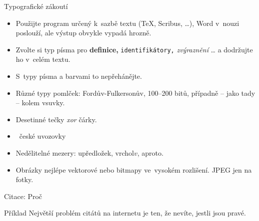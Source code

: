 \documentclass{beamer}
\begin{document}
\begin{frame}{Typografické zákoutí}

\begin{itemize}
\item Použijte program určený k~sazbě textu (\TeX, Scribus, \dots),
   Word v~nouzi poslouží, ale výstup obvykle vypadá hrozně.
\item Zvolte si typ písma pro {\bf definice,} {\tt identifikátory,} {\it zvýraznění\/} \dots{} a
   dodržujte ho v~celém textu.
\item S~typy písma a barvami to nepřehánějte.
\item Různé typy pomlček: Fordův-Fulkersonův, 100--200 bitů, případně -- jako tady -- kolem vsuvky.
\item Desetinné tečky {\it xor\/} čárky.
\item \clqq~české uvozovky \crqq
\item Nedělitelné mezery: u{\tt{}}předložek, vrchol{\tt{}}$v$, a{\tt{}}proto.
\item Obrázky nejlépe vektorové nebo bitmapy ve~vysokém rozlišení. JPEG jen na fotky.
\end{itemize}

\end{frame}

\begin{frame}{Citace: Proč}

\begin{block}{Příklad}
Největší problém citátů na internetu je ten,
že nevíte, jestli jsou pravé.

\end{block}

\end{frame}
\end{document}
